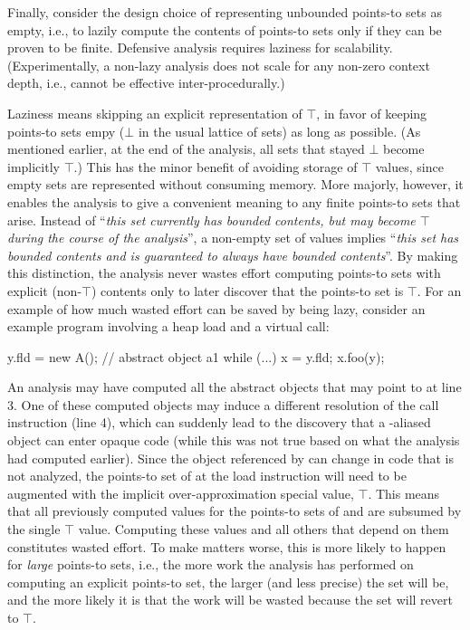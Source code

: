 Finally, consider the design choice of representing unbounded points-to sets as empty, i.e., to lazily compute the contents of points-to sets only if they can be proven to be finite. Defensive analysis requires laziness for scalability. (Experimentally, a non-lazy analysis does not scale for any non-zero context depth, i.e., cannot be effective inter-procedurally.)

Laziness means skipping an explicit representation of $\top$, in favor of keeping points-to sets empy ($\bot$ in the usual lattice of sets) as long as possible. (As mentioned earlier, at the end of the analysis, all sets that stayed $\bot$ become implicitly $\top$.) This has the minor benefit of avoiding storage of $\top$ values, since empty sets are represented without consuming memory. More majorly, however, it enables the analysis to give a convenient meaning to any finite points-to sets that arise. Instead of ``\emph{this set currently has bounded contents, but may become $\top$ during the course of the analysis}'', a non-empty set of values implies ``\emph{this set has bounded contents and is guaranteed to always have bounded contents}''. By making this distinction, the analysis never wastes effort computing points-to sets with explicit (non-$\top$) contents only to later discover that the points-to set is $\top$. For an example of how much wasted effort can be saved by being lazy, consider an example program involving a heap load and a virtual call:

\begin{javaBoxLn}
y.fld = new A();  // abstract object a1
while (...) {    
    x = y.fld;
    x.foo(y);
}
\end{javaBoxLn}

An analysis may have computed all the abstract objects that  may point to at line 3. One of these computed objects may induce a different resolution of the call instruction (line 4), which can suddenly lead to the discovery that a -aliased object can enter opaque code (while this was not true based on what the analysis had computed earlier). Since the object referenced by  can change in code that is not analyzed, the points-to set of  at the load instruction will need to be augmented with the implicit over-approximation special value, $\top$. This means that all previously computed values for the points-to sets of  and  are subsumed by the single $\top$ value. Computing these values and all others that depend on them constitutes wasted effort. To make matters worse, this is more likely to happen for \emph{large} points-to sets, i.e., the more work the analysis has performed on computing an explicit points-to set, the larger (and less precise) the set will be, and the more likely it is that the work will be wasted because the set will revert to $\top$.

